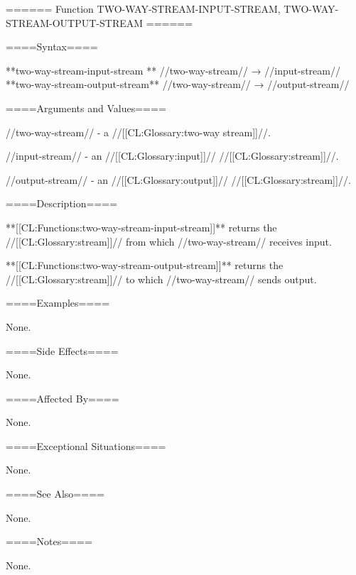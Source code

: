 ====== Function TWO-WAY-STREAM-INPUT-STREAM, TWO-WAY-STREAM-OUTPUT-STREAM ======

====Syntax====

**two-way-stream-input-stream ** //two-way-stream// → //input-stream// **two-way-stream-output-stream** //two-way-stream// → //output-stream//

====Arguments and Values====

//two-way-stream// - a //[[CL:Glossary:two-way stream]]//.

//input-stream// - an //[[CL:Glossary:input]]// //[[CL:Glossary:stream]]//.

//output-stream// - an //[[CL:Glossary:output]]// //[[CL:Glossary:stream]]//.

====Description====

**[[CL:Functions:two-way-stream-input-stream]]** returns the //[[CL:Glossary:stream]]// from which //two-way-stream// receives input.

**[[CL:Functions:two-way-stream-output-stream]]** returns the //[[CL:Glossary:stream]]// to which //two-way-stream// sends output.

====Examples====

None.

====Side Effects====

None.

====Affected By====

None.

====Exceptional Situations====

None.

====See Also====

None.

====Notes====

None.

